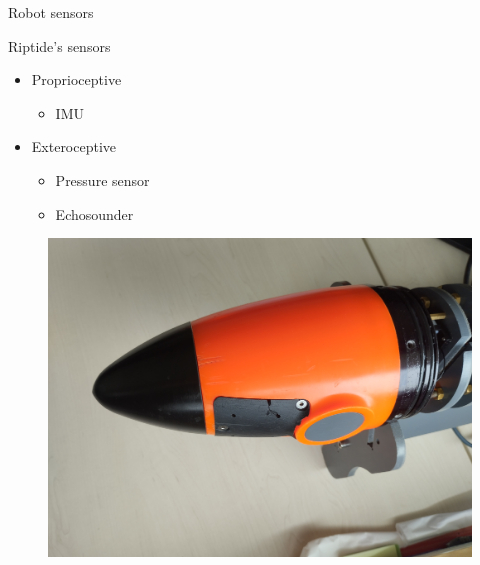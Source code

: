 \documentclass[10pt, xcolor={usenames, dvipsnames}]{beamer}
\begin{document}
        \begin{frame}{Robot sensors}
            \begin{minipage}[t]{.55\textwidth}
                \begin{exampleblock}{Riptide's sensors}
                    \vspace{0.25cm}
                    \begin{itemize}[<+->]
                        \item Proprioceptive
                        \begin{itemize}
                            \item IMU
                        \end{itemize}
                        \item Exteroceptive
                        \begin{itemize}
                            \item Pressure sensor \\ 
                            \item Echosounder
                        \end{itemize}
                    \end{itemize}
                \end{exampleblock}
            \end{minipage}
            \hfill
            \begin{minipage}[t]{.42\textwidth}
                \begin{figure}[htb]
                    \includegraphics[width=\textwidth]{imgs/echosounder.jpg}

\end{figure}
\end{minipage}
\end{frame}
\end{document}
